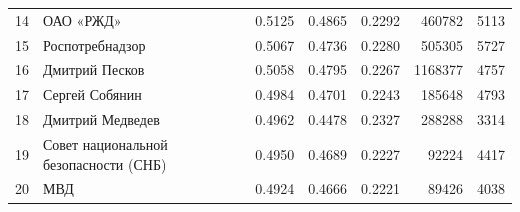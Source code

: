 \documentclass[11pt,a4paper]{article}
\begin{document}
\begin{table}[htbp]
\begin{tabular}{r l S[table-format=1.4] S[table-format=1.4] S[table-format=1.4] r r}
14 & ОАО «РЖД» & 0.5125 & 0.4865 & 0.2292 & 460782 & 5113 \\
15 & Роспотребнадзор & 0.5067 & 0.4736 & 0.2280 & 505305 & 5727 \\
16 & Дмитрий Песков & 0.5058 & 0.4795 & 0.2267 & 1168377 & 4757 \\
17 & Сергей Собянин & 0.4984 & 0.4701 & 0.2243 & 185648 & 4793 \\
18 & Дмитрий Медведев & 0.4962 & 0.4478 & 0.2327 & 288288 & 3314 \\
19 & Совет национальной безопасности (СНБ) & 0.4950 & 0.4689 & 0.2227 & 92224 & 4417 \\
20 & МВД & 0.4924 & 0.4666 & 0.2221 & 89426 & 4038 \\\bottomrule
\end{tabular}
\end{table}
\end{document}

